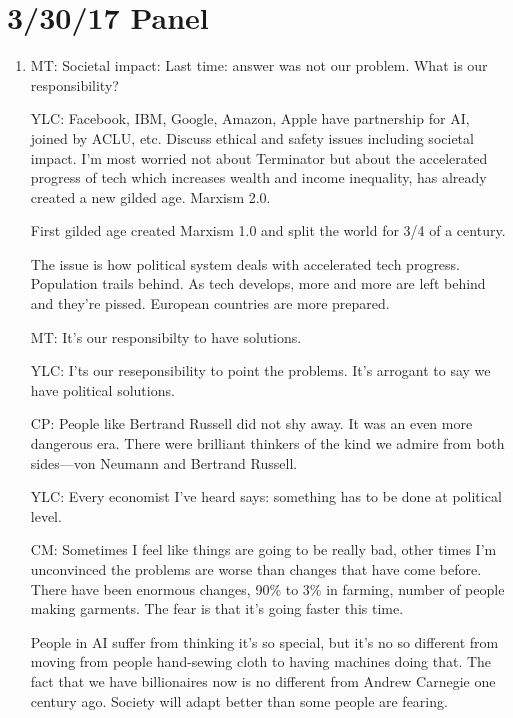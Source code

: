 \section{3/30/17 Panel}

\begin{enumerate}
\item
MT: Societal impact: Last time: answer was not our problem. What is our responsibility?

YLC: Facebook, IBM, Google, Amazon, Apple have partnership for AI, joined by ACLU, etc.  Discuss ethical and safety issues including societal impact. I'm most worried not about Terminator but about the accelerated progress of tech which increases wealth and income inequality, has already created a new gilded age. Marxism 2.0. 

First gilded age created Marxism 1.0 and split the world for 3/4 of a century.

The issue is how political system deals with accelerated tech progress. %
Population trails behind. As tech develops, more and more are left behind and they're pissed. European countries are more prepared.

MT: It's our responsibilty to have solutions.

YLC: I'ts our reseponsibility to point the problems. It's arrogant to say we have political solutions.

CP: People like Bertrand Russell did not shy away. It was an even more dangerous era. There were brilliant thinkers of the kind we admire from both sides---von Neumann and Bertrand Russell. 

YLC: Every economist I've heard says: something has to be done at political level.

CM: Sometimes I feel like things are going to be really bad, other times I'm unconvinced the problems are worse than changes that have come before. There have been enormous changes, 90\% to 3\% in farming, number of people making garments. The fear is that it's going faster this time.

People in AI suffer from thinking it's so special, but it's no so different from moving from people hand-sewing cloth to having machines doing that. The fact that we have billionaires now is no different from Andrew Carnegie one century ago. Society will adapt better than some people are fearing.


\end{enumerate}
